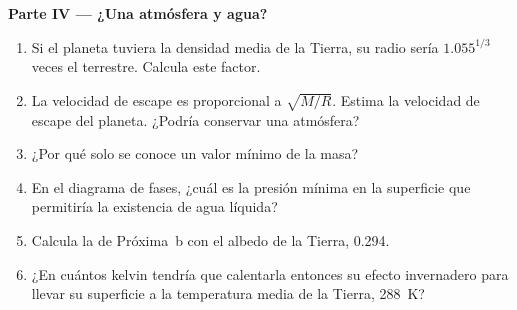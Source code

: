 \begin{problem}
\medskip
\noindent\textbf{Parte IV --- ¿Una atmósfera y agua?}
\begin{enumerate}[resume]
  \item Si el planeta tuviera la densidad media de la Tierra, su radio sería
        $1.055^{1/3}$ veces el terrestre. Calcula este factor.
  \item La velocidad de escape es proporcional a $\sqrt{M/R}$. Estima la
        velocidad de escape del planeta. ¿Podría conservar una atmósfera?
  \item ¿Por qué solo se conoce un valor mínimo de la masa?
  \item En el diagrama de fases, ¿cuál es la presión mínima en la superficie
        que permitiría la existencia de agua líquida?
  \item Calcula la  de Próxima~b con el albedo de
        la Tierra, 0.294.
  \item ¿En cuántos kelvin tendría que calentarla entonces su efecto
        invernadero para llevar su superficie a la temperatura media de la
        Tierra, \qty{288}{K}?
\end{enumerate}
\end{problem}

